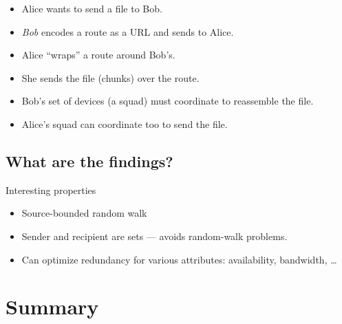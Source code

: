 \begin{frame}
  \begin{example}[Scenario]
    \begin{itemize}
      \item Alice wants to send a file to Bob.
      \item \emph{Bob} encodes a route as a URL and sends to Alice.
      \item Alice \enquote{wraps} a route around Bob's.
      \item She sends the file (chunks) over the route.
    \end{itemize}
  \end{example}

  \pause

  \begin{remark}
    \begin{itemize}
      \item Bob's set of devices (a squad) must coordinate to reassemble the 
        file.
      \item Alice's squad can coordinate too to send the file.
    \end{itemize}
  \end{remark}
\end{frame}

\subsection{What are the findings?}

\begin{frame}
  \begin{block}{Interesting properties}
    \begin{itemize}
      \item Source-bounded random walk
      \item Sender and recipient are sets --- avoids random-walk problems.
      \item Can optimize redundancy for various attributes: availability, 
        bandwidth, \dots
    \end{itemize}
  \end{block}
\end{frame}


\section{Summary}

